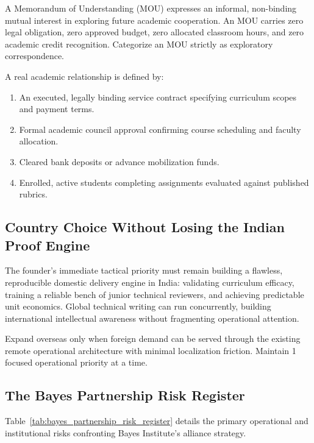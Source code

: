 A Memorandum of Understanding (MOU) expresses an informal, non-binding mutual interest in exploring future academic cooperation. An MOU carries zero legal obligation, zero approved budget, zero allocated classroom hours, and zero academic credit recognition. Categorize an MOU strictly as exploratory correspondence.

A real academic relationship is defined by:
\begin{enumerate}
\item An executed, legally binding service contract specifying curriculum scopes and payment terms.
\item Formal academic council approval confirming course scheduling and faculty allocation.
\item Cleared bank deposits or advance mobilization funds.
\item Enrolled, active students completing assignments evaluated against published rubrics.
\end{enumerate}

\subsection{Country Choice Without Losing the Indian Proof Engine}
\label{sec:country_choice_preserving_indian_engine}

The founder's immediate tactical priority must remain building a flawless, reproducible domestic delivery engine in India: validating curriculum efficacy, training a reliable bench of junior technical reviewers, and achieving predictable unit economics. Global technical writing can run concurrently, building international intellectual awareness without fragmenting operational attention.

Expand overseas only when foreign demand can be served through the existing remote operational architecture with minimal localization friction. Maintain 1 focused operational priority at a time.

\subsection{The Bayes Partnership Risk Register}
\label{sec:bayes_partnership_risk_register}

Table~\ref{tab:bayes_partnership_risk_register} details the primary operational and institutional risks confronting Bayes Institute's alliance strategy.

